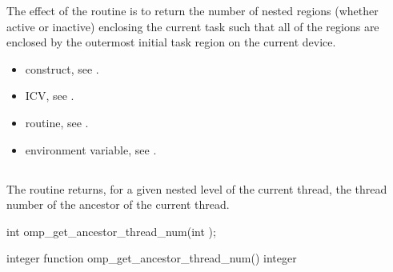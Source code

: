 \effect
The effect of the  routine is to return the number of nested
 regions (whether active or inactive) enclosing the current task such that all
of the  regions are enclosed by the outermost initial task region on the
current device.

\crossreferences
\begin{itemize}
\item {} construct, see
.

\item {} ICV, see
.

\item {} routine, see
.

\item {} environment variable, see
.
\end{itemize}










\subsection{}
\label{subsec:omp_get_ancestor_thread_num}
\summary
The  routine returns, for a given nested level of
the current thread, the thread number of the ancestor of the current thread.

\begin{samepage}
\format
\begin{ccppspecific}
\begin{ompcFunction}
int omp_get_ancestor_thread_num(int );
\end{ompcFunction}
\end{ccppspecific}
\end{samepage}

\begin{fortranspecific}
\begin{ompfFunction}
integer function omp_get_ancestor_thread_num()
integer 
\end{ompfFunction}
\end{fortranspecific}

